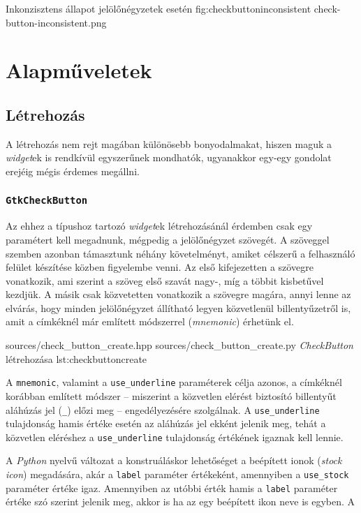 {Inkonzisztens állapot jelölőnégyzetek esetén\cite{gnomehig}}
{fig:checkbuttoninconsistent}
{check-button-inconsistent.png}

\section{Alapműveletek}

\subsection{Létrehozás}

A létrehozás nem rejt magában különösebb bonyodalmakat, hiszen maguk a \textit{widget}ek is rendkívül egyszerűnek mondhatók, ugyanakkor egy-egy gondolat erejéig mégis érdemes megállni.

\subsubsection{\texttt{GtkCheckButton}}

Az ehhez a típushoz tartozó \textit{widget}ek létrehozásánál érdemben csak egy paramétert kell megadnunk, mégpedig a jelölőnégyzet szövegét. A szöveggel szemben azonban támasztunk néhány követelményt, amiket célszerű a felhasználó felület készítése közben figyelembe venni. Az első kifejezetten a szövegre vonatkozik, ami szerint a szöveg első szavát nagy-, míg a többit kisbetűvel kezdjük. A másik csak közvetetten vonatkozik a szövegre magára, annyi lenne az elvárás, hogy minden jelölőnégyzet állítható legyen közvetlenül billentyűzetről is, amit a címkéknél már említett módszerrel (\textit{mnemonic}) érhetünk el.

{sources/check_button_create.hpp}
{sources/check_button_create.py}
{\textit{CheckButton} létrehozása}
{lst:checkbuttoncreate}

A \texttt{mnemonic}, valamint a \texttt{use\_underline} paraméterek célja azonos, a címkéknél korábban említett módszer -- miszerint a közvetlen elérést biztosító billentyűt aláhúzás jel (\texttt{\_}) előzi meg -- engedélyezésére szolgálnak. A \texttt{use\_underline} tulajdonság hamis értéke esetén az aláhúzás jel ekként jelenik meg, tehát a közvetlen eléréshez a \texttt{use\_underline} tulajdonság értékének igaznak kell lennie.

A \textit{Python} nyelvű változat a konstruáláskor lehetőséget a beépített ionok (\textit{stock icon}) megadására, akár a \texttt{label} paraméter értékeként, amennyiben a \texttt{use\_stock} paraméter értéke igaz. Amennyiben az utóbbi érték hamis a \texttt{label} paraméter értéke szó szerint jelenik meg, akkor is ha az egy beépített ikon neve is egyben. A 

